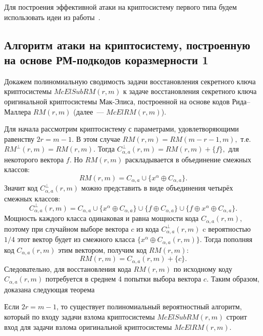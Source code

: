 Для построения эффективной атаки на криптосистему первого типа будем использовать идеи из работы~\cite{borodin2014effective}.

\subsection{Алгоритм атаки на криптосистему, построенную на основе РМ-подкодов коразмерности 1}

Докажем полиномиальную сводимость задачи восстановления секретного ключа криптосистемы \(McElSubRM(r,m)\) к задаче восстановления секретного ключа оригинальной криптосистемы Мак-Элиса, построенной на основе кодов Рида--Маллера $RM(r,m)$ (далее~--- \(McElRM(r,m)\)).

Для начала рассмотрим криптосистему с параметрами, удовлетворяющими равенству \(2r=m-1\).
В этом случае \(RM(r,m)=RM(m-r-1,m),\) т.е.
\(RM^{\perp}(r,m)=RM(r,m).\) Тогда \(C^{\perp}_{\alpha, a}(r,m) = RM(r,m) + \{f\},\) для некоторого вектора \(f.\) Но \(RM(r,m)\) раскладывается в объединение смежных классов:
\[
	RM(r,m)=C_{\alpha, a} \cup \{x^{\alpha} \oplus C_{\alpha,a}\}.
\]
Значит код \(C^{\perp}_{\alpha, a}(r,m)\) можно представить в виде объединения четырёх смежных классов:
\[
	C^{\perp}_{\alpha, a}(r,m)=C_{\alpha, a} \cup \{x^{\alpha} \oplus C_{\alpha,a}\}\cup \{f \oplus C_{\alpha,a}\}\cup \{f\oplus x^{\alpha} \oplus C_{\alpha,a}\}.
\]
Мощность каждого класса одинаковая и равна мощности кода \(C_{\alpha,a}(r,m),\) поэтому при случайном выборе вектора \(c\) из кода \(C^{\perp}_{\alpha,a}(r,m)\) c вероятностью \(1/4\) этот вектор будет из смежного класса \(\{x^{\alpha} \oplus C_{\alpha,a}(r,m)\}\).
Тогда пополняя код \(C_{\alpha, a}(r,m)\) этим вектором, получим код \(RM(r,m):\)
\[
	RM(r,m) = C_{\alpha, a}(r,m) + \{c\}.
\]
Следовательно, для восстановления кода \(RM(r,m)\) по исходному коду \(C_{\alpha,a }(r,m)\) потребуется в среднем 4 попытки выбора вектора \(c\).
Таким образом, доказана следующая теорема

\begin{theorem}
	\label{th_2r_equal_m_minus_1}
	Если \(2r=m-1\), то существует полиномиальный вероятностный алгоритм, который по входу задачи взлома криптосистемы \(McElSubRM(r,m)\) строит вход для задачи взлома оригинальной криптосистемы \(McElRM(r,m)\).

\end{theorem}


